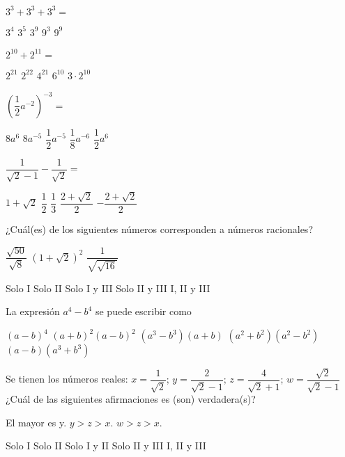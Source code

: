 \documentclass[]{srs}
\begin{document}
\begin{preguntas}

\pregunta $3^3 + 3^3 + 3^3 =$
\begin{vertical}
\alternativa $3^4$
\alternativa $3^5$
\alternativa $3^9$
\alternativa $9^3$
\alternativa $9^9$
\end{vertical}

\pregunta $2^{10} + 2^{11} =$
\begin{vertical}
\alternativa $2^{21}$
\alternativa $2^{22}$
\alternativa $4^{21}$
\alternativa $6^{10}$
\alternativa $3 \cdot 2^{10}$
\end{vertical}

\pregunta $\left(\dfrac{1}{2}a^{-2}\right)^{-3} =$
\begin{vertical}
\alternativa $8a^6$
\alternativa $8a^{-5}$
\alternativa $\dfrac{1}{2}a^{-5}$
\alternativa $\dfrac{1}{8}a^{-6}$
\alternativa $\dfrac{1}{2}a^6$
\end{vertical}

\pregunta $\dfrac{1}{\sqrt{2} - 1} - \dfrac{1}{\sqrt{2}} =$
\begin{vertical}
\alternativa $1 + \sqrt{2}$
\alternativa $\dfrac{1}{2}$
\alternativa $\dfrac{1}{3}$
\alternativa $\dfrac{2 + \sqrt{2}}{2}$
\alternativa $-\dfrac{2 + \sqrt{2}}{2}$
\end{vertical}

\pregunta ¿Cuál(es) de los siguientes números corresponden a números racionales?
\begin{verticali}
\alternativa $\dfrac{\sqrt{50}}{\sqrt{8}}$
\alternativa $\left(1 + \sqrt{2}\right)^2$
\alternativa $\dfrac{1}{\sqrt{\sqrt{16}}}$
\end{verticali}
\begin{vertical}
\alternativa Solo I
\alternativa Solo II
\alternativa Solo I y III
\alternativa Solo II y III
\alternativa I, II y III
\end{vertical}

\pregunta La expresión $a^4 - b^4$ se puede escribir como
\begin{vertical}
\alternativa $\left(a-b\right)^4$
\alternativa $\left(a+b\right)^2\left(a-b\right)^2$
\alternativa $\left(a^3-b^3\right)\left(a+b\right)$
\alternativa $\left(a^2+b^2\right)\left(a^2-b^2\right)$
\alternativa $\left(a-b\right)\left(a^3+b^3\right)$
\end{vertical}

\pregunta Se tienen los números reales: $x = \dfrac{1}{\sqrt{2}}$; $y = \dfrac{2}{\sqrt{2} - 1}$; $z = \dfrac{4}{\sqrt{2} + 1}$; $w = \dfrac{\sqrt{2}}{\sqrt{2} - 1}$ ¿Cuál de las siguientes afirmaciones es (son) verdadera(s)?
\begin{verticali}
\alternativa El mayor es y.
\alternativa $y > z > x$.
\alternativa $w > z > x$.
\end{verticali}
\begin{vertical}
\alternativa Solo I
\alternativa Solo II
\alternativa Solo I y II
\alternativa Solo II y III
\alternativa I, II y III
\end{vertical}



\end{preguntas}
\end{document}
